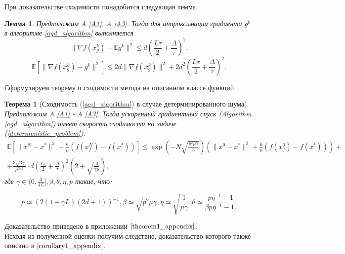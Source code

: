 \documentclass{article}
\newtheorem{theorem}{Теорема}
\newtheorem{lemma}{Лемма}
\begin{document}
При доказательстве сходимости понадобится следующая лемма.
\begin{lemma}\label{lemma1}
 Предположим A \ref{A1}, A \ref{A3}. Тогда для аппроксимации градиента $g^k$ в алгоритме \ref{agd_algorithm} выполняется
 \begin{equation}
  \|\nabla f(x_g^k) - \mathbb{E}g^k\|^2 \leqslant d \left(\frac{L\tau}{2} + \frac{\Delta}{\tau}\right)^2.
  \label{norm_of_expectation}
 \end{equation}
 \begin{equation}
  \mathbb{E}[\|\nabla f(x_g^k) - g^k\|^2] \leqslant 2d \|\nabla f(x_g^k)\|^2 + 2 d^2 \left(\frac{L\tau}{2} + \frac{\Delta}{\tau}\right)^2.
  \label{expectation_of_norm}
 \end{equation}
\end{lemma}

Сформулируем теорему о сходимости метода на описанном классе функций.

\begin{theorem}[Сходимость (\ref{agd_algorithm}) в случае детерминированного шума]\label{theorem1}
  Предположим A \ref{A1} - A \ref{A3}. Тогда ускоренный градиентный спуск (Algorithm \ref{agd_algorithm}) имеет скорость сходимости на задаче (\ref{determenistic_problem}):
  \begin{equation}
   \begin{aligned}
   \mathbb{E}\left[\|x^N - x^*\|^2 + \frac{6}{\mu} (f(x_f^N) - f(x^*))\right] \leqslant \exp\left(- N\sqrt{\frac{p^2\mu\gamma}{3}}\right) \left(\|x^0 - x^*\|^2 + \frac{6}{\mu} (f(x_f^0) - f(x^*))\right) +\\ +\frac{3 \sqrt{3\gamma}}{\mu^{3/2}} \cdot d \left(\frac{L\tau}{2} + \frac{\Delta}{\tau}\right)^2\left(2 + \sqrt{\frac{3}{\gamma\mu}}\right),
   \label{deterministic_convergence}
   \end{aligned}
  \end{equation}
  где $\gamma \in (0, \frac{3}{4L}], \beta, \theta, \eta, p$ такие, что:

  \begin{equation}
   p \simeq (2(1 + \gamma L)(2d + 1))^{-1}, \beta \simeq \sqrt{p^2 \mu \gamma}, \eta \simeq \sqrt{\frac{1}{\mu\gamma}}, \theta \simeq \frac{p \eta^{-1} - 1}{\beta p \eta^{-1} - 1.}
  \end{equation}

\end{theorem}

Доказательство приведено в приложении $\ref{theorem1_appendix}$.\\
Исходя из полученной оценки получим следствие, доказательство которого также описано в $\ref{corollary1_appendix}$.
\end{document}
